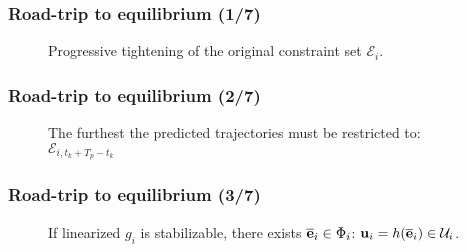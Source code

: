 \begin{frame} %
  \frametitle{Road-trip to equilibrium (1/7)}

\begin{figure}
  \scalebox{0.55}{}
  \caption{Progressive tightening of the original constraint set $\mathcal{E}_i$.}
\end{figure}

\end{frame} %
\begin{frame} %
  \frametitle{Road-trip to equilibrium (2/7)}

\begin{figure}
  \scalebox{0.55}{}
  \caption{The furthest the predicted trajectories must be restricted to: $\mathcal{E}_{i,t_k + T_p - t_k}$}
\end{figure}

\end{frame} %
\begin{frame} %
  \frametitle{Road-trip to equilibrium (3/7)}

\begin{figure}
  \scalebox{0.55}{}
  \caption{If linearized $g_i$ is stabilizable, there exists $\overline{\bm{\mathbf{e}}}_i \in \Phi_i$: $\bm{\mathbf{u}}_i = h(\overline{\bm{\mathbf{e}}}_i) \in \mathcal{U}_i$.}
\end{figure}

\end{frame} %
